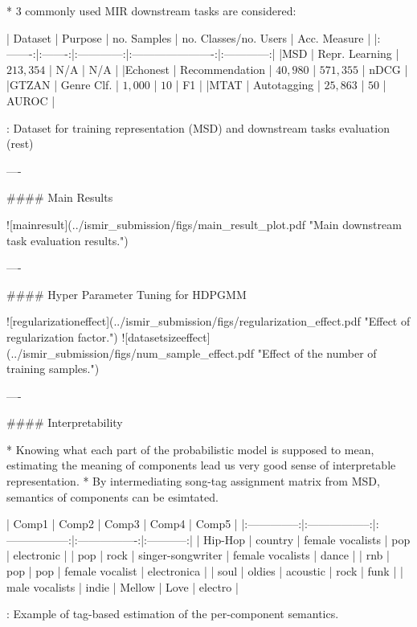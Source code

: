 \documentclass{beamer}
\begin{document}
\begin{frame}[fragile]
\begin{columns}[T]
\begin{column}{.46\textwidth}
\begin{markdown}
* 3 commonly used MIR downstream tasks are considered:

| Dataset | Purpose | no. Samples  | no. Classes/no. Users  | Acc. Measure |
|:-------:|:-------:|:------------:|:----------------------:|:------------:|
|MSD      | Repr. Learning | $213,354$ | N/A               | N/A          |
|Echonest | Recommendation | $40,980$  | $571,355$         | nDCG         |
|GTZAN    | Genre Clf. | $1,000$   | $10$              | F1           |
|MTAT     | Autotagging | $25,863$  | $50$              | AUROC        |

  : Dataset for training representation (MSD) and downstream tasks evaluation (rest)

----

#### Main Results

![mainresult](../ismir_submission/figs/main_result_plot.pdf "Main downstream task evaluation results.")

----

#### Hyper Parameter Tuning for HDPGMM

![regularizationeffect](../ismir_submission/figs/regularization_effect.pdf "Effect of regularization factor.")
![datasetsizeeffect](../ismir_submission/figs/num_sample_effect.pdf "Effect of the number of training samples.")

----


#### Interpretability

* Knowing what each part of the probabilistic model is supposed to mean, estimating the meaning of components lead us very good sense of interpretable representation.
* By intermediating song-tag assignment matrix from MSD, semantics of components can be esimtated.


|  Comp1         |  Comp2            |  Comp3            |  Comp4           | Comp5       |
|:--------------:|:-----------------:|:-----------------:|:----------------:|:-----------:|
| Hip-Hop        | country           | female vocalists  | pop              | electronic  |
| pop            | rock              | singer-songwriter | female vocalists | dance       |
| rnb            | pop               | pop               | female vocalist  | electronica |
| soul           | oldies            | acoustic          | rock             | funk        |
| male vocalists | indie             | Mellow            | Love             | electro     |

  : Example of tag-based estimation of the per-component semantics.


\end{markdown}
\end{column}
\end{columns}
\end{frame}
\end{document}
